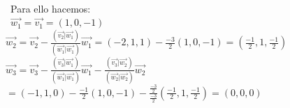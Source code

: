 \documentclass[preview]{standalone}
\begin{document}
\begin{center}
 \\\  Para ello hacemos: \\\  $\vec{w_1} = \vec{v_1} = (1, 0, -1)$  \newline $\vec{w_2} = \vec{v_2} - \frac{(\vec{v_2} | \vec{w_1})}{(\vec{w_1} | \vec{w_1})} \vec{w_1} = (-2, 1, 1) - \frac{-3}{2} (1, 0, -1) = (\frac{-1}{2}, 1, \frac{-1}{2} ) $ \newline $\vec{w_3} = \vec{v_3} - \frac{(\vec{v_3} | \vec{w_1})}{(\vec{w_1} | \vec{w_1})} \vec{w_1} - \frac{(\vec{v_3} | \vec{w_2})}{(\vec{w_2} | \vec{w_2})} \vec{w_2} $\newline $ = (-1, 1, 0) - \frac{-1}{2} (1, 0, -1) - \frac{\frac{-3}{2}}{\frac{-3}{2}} (\frac{-1}{2}, 1, \frac{-1}{2}) = (0, 0, 0) $ \\\ \\\
\end{center}
\end{document}
